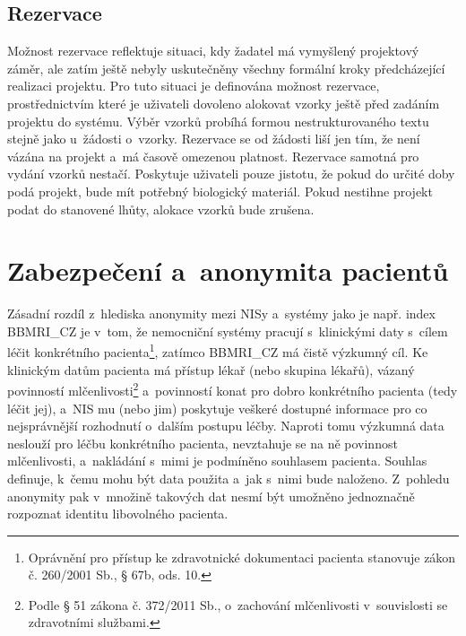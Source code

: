 \documentclass[11pt, draft, oneside]{fithesis2}
\newcommand{\ProjectName}{\mbox{BBMRI\_CZ}\xspace}
\begin{document}
\subsection{Rezervace}
Možnost rezervace reflektuje situaci, kdy žadatel má vymyšlený projektový záměr, ale zatím ještě nebyly uskutečněny všechny formální kroky předcházející realizaci projektu. Pro tuto situaci je definována možnost rezervace, prostřednictvím které je uživateli dovoleno alokovat vzorky ještě před zadáním projektu do systému. Výběr vzorků probíhá formou nestrukturovaného textu stejně jako u~žádosti o~vzorky. Rezervace se od žádosti liší jen tím, že není vázána na projekt a~má časově omezenou platnost.
Rezervace samotná pro vydání vzorků nestačí. Poskytuje uživateli pouze jistotu, že pokud do určité doby podá projekt, bude mít potřebný biologický materiál. Pokud nestihne projekt podat do stanovené lhůty, alokace vzorků bude zrušena.

\section{Zabezpečení a~anonymita pacientů}
Zásadní rozdíl z~hlediska anonymity mezi NISy a~systémy jako je např. index \ProjectName je v~tom, že nemocniční systémy pracují s~klinickými daty s~cílem léčit konkrétního pacienta\footnote{Oprávnění pro přístup ke zdravotnické dokumentaci pacienta stanovuje zákon č. 260/2001 Sb., § 67b, ods. 10.}, zatímco \ProjectName má čistě výzkumný cíl. Ke klinickým datům pacienta má přístup lékař (nebo skupina lékařů), vázaný povinností mlčenlivosti\footnote{Podle § 51 zákona č. 372/2011 Sb., o~zachování mlčenlivosti v~souvislosti se zdravotními službami.} a~povinností konat pro dobro konkrétního pacienta (tedy léčit jej), a~NIS mu (nebo jim) poskytuje veškeré dostupné informace pro co nejsprávnější rozhodnutí o~dalším postupu léčby. Naproti tomu výzkumná data neslouží pro léčbu konkrétního pacienta, nevztahuje se na ně povinnost mlčenlivosti, a~nakládání s~mimi je podmíněno souhlasem pacienta. Souhlas definuje, k~čemu mohu být data použita a~jak s~nimi bude naloženo. Z~pohledu anonymity pak v~množině takových dat nesmí být umožněno jednoznačně rozpoznat identitu libovolného pacienta. 

\end{document}
